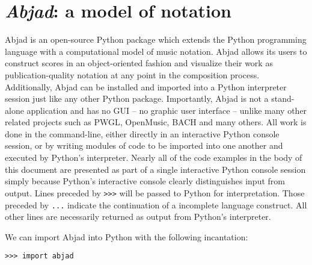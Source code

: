 \chapter{\emph{Abjad}: a model of notation}
\label{chap:a-model-of-notation}

Abjad\cite{baca2011xi, trevino2013compositional} is an open-source
Python\cite{vanrossum2003ys} package which extends the Python programming
language with a computational model of music notation. Abjad allows its users
to construct scores in an object-oriented fashion and visualize their work as
publication-quality notation at any point in the composition process.
Additionally, Abjad can be installed and imported into a Python interpreter
session just like any other Python package. Importantly, Abjad is not a
stand-alone application and has no GUI -- no graphic user interface -- unlike
many other related projects such as PWGL\cite{laurson2009qf,
kuuskankare2004recent}, OpenMusic\cite{assayag1999sw},
BACH\cite{agostini2013real} and many others. All work is done in the
command-line, either directly in an interactive Python console session, or by
writing modules of code to be imported into one another and executed by
Python's interpreter. Nearly all of the code examples in the body of this
document are presented as part of a single interactive Python console session
simply because Python's interactive console clearly distinguishes input from
output. Lines preceded by \texttt{>>>} will be passed to Python for
interpretation. Those preceded by \texttt{...} indicate the continuation of a
incomplete language construct. All other lines are necessarily returned as
output from Python's interpreter.



We can import Abjad into Python with the following incantation:

\begin{comment}
<abjad>
import abjad
</abjad>
\end{comment}

\begin{abjadbookoutput}
\begin{singlespacing}
\vspace{-0.5\baselineskip}
\begin{lstlisting}
>>> import abjad
\end{lstlisting}
\end{singlespacing}
\end{abjadbookoutput}

